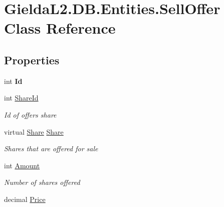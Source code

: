 \hypertarget{class_gielda_l2_1_1_d_b_1_1_entities_1_1_sell_offer}{}\section{Gielda\+L2.\+D\+B.\+Entities.\+Sell\+Offer Class Reference}
\label{class_gielda_l2_1_1_d_b_1_1_entities_1_1_sell_offer}
\subsection*{Properties}
\begin{DoxyCompactItemize}
\item 
\mbox{\label{class_gielda_l2_1_1_d_b_1_1_entities_1_1_sell_offer_a235e1b4c7e31b8fc1925251a2924072e}} 
int {\bfseries Id}
\item 
int \mbox{\hyperlink{class_gielda_l2_1_1_d_b_1_1_entities_1_1_sell_offer_a0dbcb24e116e87f43cbe07efee92dc34}{Share\+Id}}
\begin{DoxyCompactList}\small\item\em Id of offers share \end{DoxyCompactList}\item 
virtual \mbox{\hyperlink{class_gielda_l2_1_1_d_b_1_1_entities_1_1_share}{Share}} \mbox{\hyperlink{class_gielda_l2_1_1_d_b_1_1_entities_1_1_sell_offer_aff6a20acb0195d70225bb65c49977fa3}{Share}}
\begin{DoxyCompactList}\small\item\em Shares that are offered for sale \end{DoxyCompactList}\item 
int \mbox{\hyperlink{class_gielda_l2_1_1_d_b_1_1_entities_1_1_sell_offer_a859b9daefceda69ff1520c4192a39335}{Amount}}
\begin{DoxyCompactList}\small\item\em Number of shares offered \end{DoxyCompactList}\item 
decimal \mbox{\hyperlink{class_gielda_l2_1_1_d_b_1_1_entities_1_1_sell_offer_a857ee5461635c6d2e07e6dd3bd4397e4}{Price}}

\end{DoxyCompactItemize}
